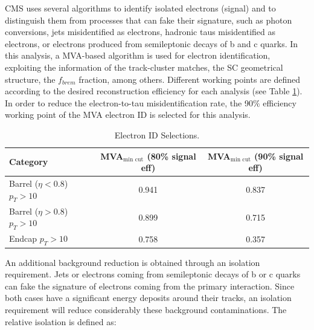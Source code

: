 \noindent CMS uses several algorithms to identify isolated electrons (signal) and to distinguish
them from processes that can fake their signature, such as photon conversions, jets 
misidentified as electrons,  hadronic taus misidentified as electrons, or electrons 
produced from semileptonic decays of b and c quarks. In this analysis, a MVA-based
algorithm is used for electron identification, exploiting  the information of the
track-cluster matches, the SC geometrical structure, the $f_{brem}$ fraction, among others. 
Different working points are defined according to the desired reconstruction efficiency for 
each analysis (see Table \ref{eIDtable}). In order to reduce the electron-to-tau 
misidentification rate, the 90$\%$ efficiency working point of the MVA 
electron ID is selected for this analysis.\\

\begin{table}[ht]                                                                                                                              
\begin{center}
  \begin{tabular}{| l | c | c | }
 \hline\hline
       Category                             & MVA$_{\textrm{min cut}}$ (80\% signal eff)    & MVA$_{\textrm{min cut}}$ (90\% signal eff)  \\ \hline 
       Barrel ($\eta < 0.8$) $p_{T}>10$     & 0.941                                         & 0.837                     \\
       Barrel ($\eta > 0.8$) $p_{T}>10$     & 0.899                                         & 0.715                     \\
       Endcap $p_{T}>10$                    & 0.758                                         & 0.357                     \\
 \hline
 \hline
 \end{tabular}
 \caption{Electron ID Selections.\label{eIDtable}}
\end{center}
\end{table}

\noindent An additional background reduction is obtained through an isolation requirement. Jets or
electrons coming from semileptonic decays of b or c quarks can fake the signature 
of electrons coming from the primary interaction. Since both cases have a significant
energy deposits around their tracks, an isolation requirement will reduce considerably 
these background contaminations. The relative isolation is defined as:


